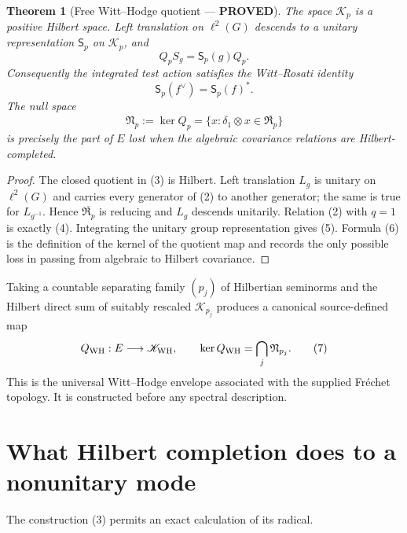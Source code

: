 \documentclass[11pt]{article}
\newcommand{\PROVED}{\textcolor{green!40!black}{\textbf{PROVED}}}
\newtheorem{theorem}{Theorem}
\begin{document}
\begin{theorem}[Free Witt--Hodge quotient --- \PROVED]
The space $\mathscr K_p$ is a positive Hilbert space.  Left translation on
$\ell^2(G)$ descends to a unitary representation $\mathsf S_p$ on
$\mathscr K_p$, and
\begin{equation}
       Q_pS_g=\mathsf S_p(g)Q_p.                     \tag{4}
\end{equation}
Consequently the integrated test action satisfies the Witt--Rosati
identity
\begin{equation}
       \mathsf S_p(f^\vee)=\mathsf S_p(f)^*.         \tag{5}
\end{equation}
The null space
\begin{equation}
 \mathfrak N_p:=\ker Q_p
 =\{x:\delta_1\otimes x\in\overline{\mathfrak R_p}\} \tag{6}
\end{equation}
is precisely the part of $E$ lost when the algebraic covariance relations
are Hilbert-completed.
\end{theorem}

\begin{proof}
The closed quotient in (3) is Hilbert.  Left translation $L_g$ is unitary
on $\ell^2(G)$ and carries every generator of (2) to another generator;
the same is true for $L_{g^{-1}}$.  Hence $\overline{\mathfrak R_p}$ is
reducing and $L_g$ descends unitarily.  Relation (2) with $q=1$ is exactly
(4).  Integrating the unitary group representation gives (5).  Formula
(6) is the definition of the kernel of the quotient map and records the
only possible loss in passing from algebraic to Hilbert covariance.
\end{proof}

Taking a countable separating family $(p_j)$ of Hilbertian seminorms and
the Hilbert direct sum of suitably rescaled $\mathscr K_{p_j}$ produces a
canonical source-defined map
\begin{equation}
 Q_{\rm WH}:E\longrightarrow\mathscr K_{\rm WH},
 \qquad
 \ker Q_{\rm WH}=\bigcap_j\mathfrak N_{p_j}.         \tag{7}
\end{equation}
This is the universal Witt--Hodge envelope associated with the supplied
Fr\'echet topology.  It is constructed before any spectral description.

\section{What Hilbert completion does to a nonunitary mode}

The construction (3) permits an exact calculation of its radical.
\end{document}
